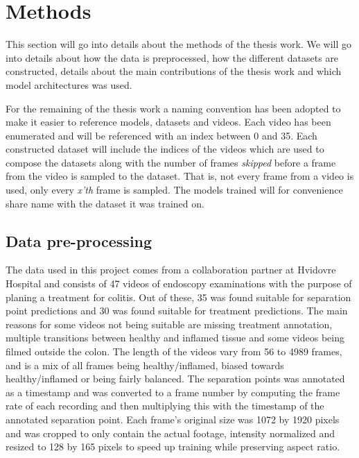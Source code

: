 \section{Methods}
This section will go into details about the methods of the thesis work. We will go into details about how the data is preprocessed, how the different datasets are constructed, details about the main contributions of the thesis work and which model architectures was used.

For the remaining of the thesis work a naming convention has been adopted to make it easier to reference models, datasets and videos. Each video has been enumerated and will be referenced with an index between 0 and 35. Each constructed dataset will include the indices of the videos which are used to compose the datasets along with the number of frames \textit{skipped} before a frame from the video is sampled to the dataset. That is, not every frame from a video is used, only every \textit{x'th} frame is sampled. The models trained will for convenience share name with the dataset it was trained on. 

\subsection{Data pre-processing}
The data used in this project comes from a collaboration partner at Hvidovre Hospital and consists of 47 videos of endoscopy examinations with the purpose of planing a treatment for colitis. Out of these, 35 was found suitable for separation point predictions and 30 was found suitable for treatment predictions. The main reasons for some videos not being suitable are missing treatment annotation, multiple transitions between healthy and inflamed tissue and some videos being filmed outside the colon. The length of the videos vary from 56 to 4989 frames, and is a mix of all frames being healthy/inflamed, biased towards healthy/inflamed or being fairly balanced. The separation points was annotated as a timestamp and was converted to a frame number by computing the frame rate of each recording and then multiplying this with the timestamp of the annotated separation point. Each frame's original size was 1072 by 1920 pixels and was cropped to only contain the actual footage, intensity normalized and resized to 128 by 165 pixels to speed up training while preserving aspect ratio.

